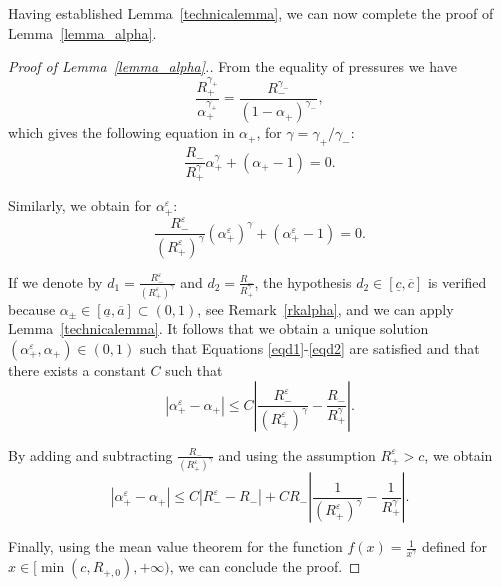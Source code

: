 \documentclass[11pt, twoside, a4paper]{article}
\theoremstyle{plain}
\theoremstyle{remark}
\numberwithin{equation}{section}
\renewcommand{\leq}{\leqslant}\renewcommand{\le}{\leqslant}
\newcommand{\eps}{\varepsilon}
\newcommand{\ap}{\alpha_+}
\newcommand{\gp}{\gamma_{+}}
\newcommand{\gm}{\gamma_-}
\begin{document}
Having established Lemma~\ref{technicalemma}, we can now complete the proof of Lemma~\ref{lemma_alpha}.

\begin{proof}[Proof of Lemma~\ref{lemma_alpha}.]
From the equality of pressures we have
\begin{equation*}
 \frac{R_+^{\gp}}{\ap^{\gp}} = \frac{R_-^{\gm}}{(1-\ap)^{\gm}},
\end{equation*}
which gives the following equation in $\ap$, for $\gamma=\gp/\gm$:
\begin{equation}\label{eqd1}
 \frac{R_-}{R_+^{\gamma}} \ap^\gamma + (\ap-1)=0.
\end{equation}

Similarly, we obtain for $\ap^\eps$:
\begin{equation}\label{eqd2}
 \frac{R_-^\eps}{(R_+^\eps)^\gamma} (\ap^\eps)^\gamma + (\ap^\eps-1) = 0.
\end{equation}

If we denote by $d_1 = \frac{R_-^\eps}{(R_+^\eps)^\gamma}$ and $d_2 = \frac{R_-}{R_+^{\gamma}}$, the hypothesis $d_2 \in [\underline{c},\overline{c}]$ is verified because $\alpha_\pm\in [\underline{a},\overline{a}]\subset (0,1)$, see Remark~\ref{rkalpha}, and we can apply Lemma~\ref{technicalemma}. It follows that we obtain a unique solution $(\ap^\eps,\ap) \in (0,1)$ such that Equations \eqref{eqd1}-\eqref{eqd2} are satisfied and that there exists a constant $C$ such that
\begin{equation*}
 | \ap^\eps - \ap | \leq C \left\lvert \frac{R_-^\eps}{(R_+^\eps)^\gamma} - \frac{R_-}{R_+^{\gamma}} \right\rvert.
\end{equation*}

By adding and subtracting $\frac{R_-}{(R_+^\eps)^{\gamma}}$ and using the assumption $R_+^\eps > c$, we obtain
\begin{equation*}
 | \ap^\eps - \ap | \leq C \left\lvert R_-^\eps - R_- \right\rvert + C R_- \left\lvert \frac{1}{(R_+^\eps)^\gamma} - \frac{1}{R_+^{\gamma}} \right\rvert.
\end{equation*}

Finally, using the mean value theorem for the function $f(x) = \frac{1}{x^\gamma}$ defined for $x \in [\min(c,R_{+,0}),+\infty)$, we can conclude the proof.
\end{proof}
\end{document}
